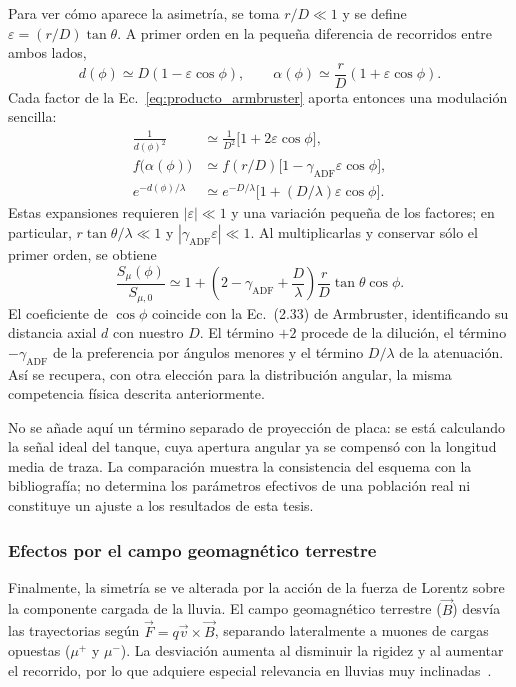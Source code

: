 Para ver cómo aparece la asimetría, se toma $r/D\ll1$ y se define $\varepsilon=(r/D)\tan\theta$. A primer orden en la pequeña diferencia de recorridos entre ambos lados,
\[
d(\phi)\simeq D(1-\varepsilon\cos\phi),
\qquad
\alpha(\phi)\simeq\frac{r}{D}(1+\varepsilon\cos\phi).
\]
Cada factor de la Ec.~\ref{eq:producto_armbruster} aporta entonces una modulación sencilla:
\begin{align*}
\frac{1}{d(\phi)^2}&\simeq\frac{1}{D^2}
\bigl[1+2\varepsilon\cos\phi\bigr],
\\
f\bigl(\alpha(\phi)\bigr)&\simeq f(r/D)
\bigl[1-\gamma_{\mathrm{ADF}}\varepsilon\cos\phi\bigr],
\\
e^{-d(\phi)/\lambda}&\simeq e^{-D/\lambda}
\bigl[1+(D/\lambda)\varepsilon\cos\phi\bigr].
\end{align*}
Estas expansiones requieren $|\varepsilon|\ll1$ y una variación pequeña de los factores; en particular, $r\tan\theta/\lambda\ll1$ y $|\gamma_{\mathrm{ADF}}\varepsilon|\ll1$. Al multiplicarlas y conservar sólo el primer orden, se obtiene
\begin{equation}
\frac{S_\mu(\phi)}{S_{\mu,0}}\simeq
1+\left(2-\gamma_{\mathrm{ADF}}+\frac{D}{\lambda}\right)
\frac{r}{D}\tan\theta\cos\phi.
\label{eq:amplitud_armbruster}
\end{equation}
El coeficiente de $\cos\phi$ coincide con la Ec.~(2.33) de Armbruster, identificando su distancia axial $d$ con nuestro $D$. El término $+2$ procede de la dilución, el término $-\gamma_{\mathrm{ADF}}$ de la preferencia por ángulos menores y el término $D/\lambda$ de la atenuación. Así se recupera, con otra elección para la distribución angular, la misma competencia física descrita anteriormente.

No se añade aquí un término separado de proyección de placa: se está calculando la señal ideal del tanque, cuya apertura angular ya se compensó con la longitud media de traza. La comparación muestra la consistencia del esquema con la bibliografía; no determina los parámetros efectivos de una población real ni constituye un ajuste a los resultados de esta tesis.

\subsubsection{Efectos por el campo geomagnético terrestre}
\label{subsubsec:geomagnetico}

Finalmente, la simetría se ve alterada por la acción de la fuerza de Lorentz sobre la componente cargada de la lluvia. El campo geomagnético terrestre ($\vec B$) desvía las trayectorias según $\vec F=q\vec v\times\vec B$, separando lateralmente a muones de cargas opuestas ($\mu^+$ y $\mu^-$). La desviación aumenta al disminuir la rigidez y al aumentar el recorrido, por lo que adquiere especial relevancia en lluvias muy inclinadas~\cite{collaboration_2014,Cazon2012}.


